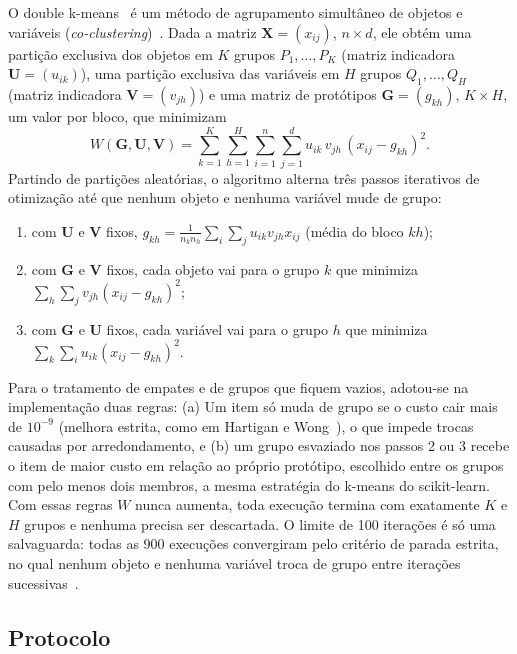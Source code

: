 \documentclass[11pt,a4paper]{article}
\begin{document}
O double k-means~\cite{vichi2001double} é um método de agrupamento simultâneo de objetos e variáveis
(\textit{co-clustering})~\cite{govaert2013coclustering}. Dada a matriz $\mathbf{X}=(x_{ij})$, $n\times d$, ele
obtém uma partição exclusiva dos objetos em $K$ grupos $P_1,\dots,P_K$ (matriz indicadora $\mathbf{U}=(u_{ik})$),
uma partição exclusiva das variáveis em $H$ grupos $Q_1,\dots,Q_H$ (matriz indicadora $\mathbf{V}=(v_{jh})$) e uma
matriz de protótipos $\mathbf{G}=(g_{kh})$, $K\times H$, um valor por bloco, que minimizam
\begin{equation}
W(\mathbf{G},\mathbf{U},\mathbf{V}) = \sum_{k=1}^{K}\sum_{h=1}^{H}\sum_{i=1}^{n}\sum_{j=1}^{d}
  u_{ik}\,v_{jh}\,(x_{ij}-g_{kh})^2 .
\label{eq:W}
\end{equation}
Partindo de partições aleatórias, o algoritmo alterna três passos iterativos de otimização até que nenhum objeto e nenhuma variável mude de grupo:
\begin{enumerate}
\item com $\mathbf{U}$ e $\mathbf{V}$ fixos, $g_{kh}=\frac{1}{n_k n_h}\sum_{i}\sum_{j}u_{ik}v_{jh}x_{ij}$ (média do
  bloco $kh$);
\item com $\mathbf{G}$ e $\mathbf{V}$ fixos, cada objeto vai para o grupo $k$ que minimiza
  $\sum_h\sum_j v_{jh}(x_{ij}-g_{kh})^2$;
\item com $\mathbf{G}$ e $\mathbf{U}$ fixos, cada variável vai para o grupo $h$ que minimiza
  $\sum_k\sum_i u_{ik}(x_{ij}-g_{kh})^2$.
\end{enumerate}
Para o tratamento de empates e de grupos que fiquem vazios, adotou-se na implementação duas regras: (a) Um item só muda de grupo se o custo cair mais 
de $10^{-9}$ (melhora estrita, como em Hartigan e Wong~\cite{hartigan1979kmeans}), o que impede trocas causadas por arredondamento, e (b) um grupo esvaziado 
nos passos 2 ou 3 recebe o item de maior custo em relação ao próprio protótipo, escolhido entre os grupos com pelo menos dois membros, a mesma estratégia
do k-means do scikit-learn. Com essas regras $W$ nunca aumenta, toda execução termina com exatamente $K$ e $H$ grupos e nenhuma precisa ser descartada.
O limite de 100 iterações é só uma salvaguarda: todas as 900 execuções convergiram pelo critério de parada estrita, no qual nenhum objeto e nenhuma 
variável troca de grupo entre iterações sucessivas~\cite{vichi2001double}.

\subsection{Protocolo}\label{sec:q1-protocolo}
\end{document}
